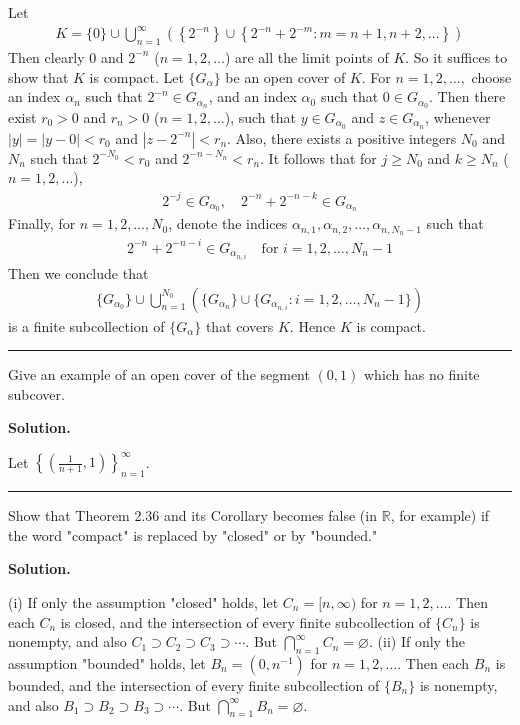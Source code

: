 \documentclass[12pt]{article}
\theoremstyle{definition}
\begin{document}
Let
\begin{align*}
K=\{0\}\cup\bigcup_{n=1}^\infty\left(\left\{2^{-n}\right\}\cup\left\{2^{-n}+2^{-m}:m=n+1,n+2,\ldots\right\}\right)
\end{align*}
Then clearly $0$ and $2^{-n}$ ($n=1,2,\ldots$) are all the limit points of $K$. So it suffices to show that $K$ is compact. Let $\{G_\alpha\}$ be an open cover of $K$. For $n=1,2,\ldots,$ choose an index $\alpha_n$ such that $2^{-n}\in G_{\alpha_n}$, and an index $\alpha_0$ such that $0\in G_{\alpha_0}$. Then there exist $r_0>0$ and $r_n>0$ ($n=1,2,\ldots$), such that $y\in G_{\alpha_0}$ and $z\in G_{\alpha_n}$, whenever $\left\vert y\right\vert=\left\vert y-0\right\vert<r_0$ and $\left\vert z-2^{-n}\right\vert<r_n$. Also, there exists a positive integers $N_0$ and $N_n$ such that $2^{-N_0}<r_0$ and $2^{-n-N_n}<r_n$. It follows that for $j\ge N_0$ and $k\ge N_n$ ($n=1,2,\ldots$),
\begin{align*}
2^{-j}\in G_{\alpha_0},\quad 2^{-n}+2^{-n-k}\in G_{\alpha_n}
\end{align*}
Finally, for $n=1,2,\ldots,N_0$, denote the indices $\alpha_{n,1},\alpha_{n,2},\ldots,\alpha_{n,N_n-1}$ such that
\begin{align*}
2^{-n}+2^{-n-i}\in G_{\alpha_{n,i}}\quad\mbox{for }i=1,2,\ldots,N_n-1
\end{align*}
Then we conclude that
\begin{align*}
\{G_{\alpha_0}\}\cup\bigcup_{n=1}^{N_0}\left(\{G_{\alpha_n}\}\cup\{G_{\alpha_{n,i}}:i=1,2,\ldots,N_n-1\}\right)
\end{align*}
is a finite subcollection of $\{G_\alpha\}$ that covers $K$. Hence $K$ is compact.



\bigskip\noindent\hrule\bigskip

Give an example of an open cover of the segment $(0,1)$ which has no finite subcover.

\smallskip
\noindent\textbf{Solution.}\quad

Let $\left\{\left(\tfrac{1}{n+1},1\right)\right\}_{n=1}^\infty$.



\bigskip\noindent\hrule\bigskip

Show that Theorem 2.36 and its Corollary becomes false (in $\mathbb{R}$, for example) if the word "compact" is replaced by "closed" or by "bounded."

\smallskip
\noindent\textbf{Solution.}\quad

(i) If only the assumption "closed" holds, let $C_n=[n,\infty)$ for $n=1,2,\ldots$. Then each $C_n$ is closed, and the intersection of every finite subcollection of $\{C_n\}$ is nonempty, and also $C_1\supset C_2\supset C_3\supset\cdots$. But $\bigcap_{n=1}^\infty C_n=\varnothing$.
(ii) If only the assumption "bounded" holds, let $B_n=\left(0,n^{-1}\right)$ for $n=1,2,\ldots$. Then each $B_n$ is bounded, and the intersection of every finite subcollection of $\{B_n\}$ is nonempty, and also $B_1\supset B_2\supset B_3\supset \cdots$. But $\bigcap_{n=1}^\infty B_n=\varnothing$.
\end{document}
